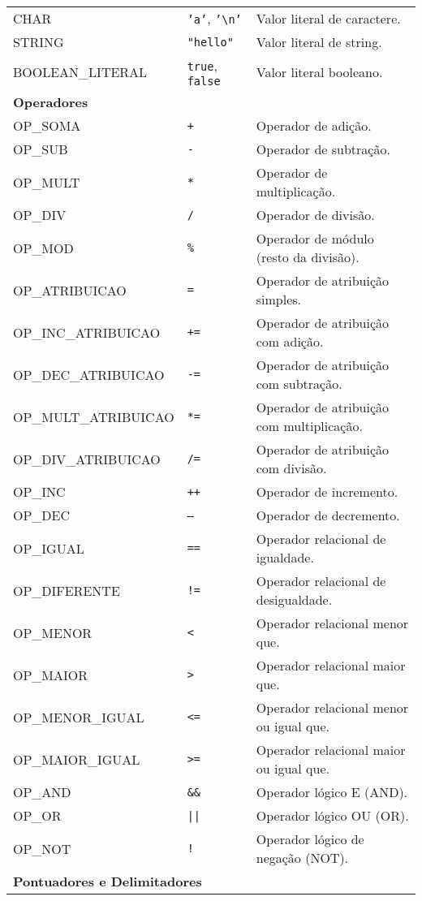 \documentclass[12pt,a4paper]{article}
\begin{document}
\begin{longtable}{lll}
CHAR & \texttt{'a'}, \texttt{'\textbackslash n'} & Valor literal de caractere. \\
STRING & \texttt{"hello"} & Valor literal de string. \\
BOOLEAN\_LITERAL & \texttt{true}, \texttt{false} & Valor literal booleano. \\
\midrule
\multicolumn{3}{l}{\textbf{Operadores}} \\
\midrule
OP\_SOMA & \texttt{+} & Operador de adição. \\
OP\_SUB & \texttt{-} & Operador de subtração. \\
OP\_MULT & \texttt{*} & Operador de multiplicação. \\
OP\_DIV & \texttt{/} & Operador de divisão. \\
OP\_MOD & \texttt{\%} & Operador de módulo (resto da divisão). \\
OP\_ATRIBUICAO & \texttt{=} & Operador de atribuição simples. \\
OP\_INC\_ATRIBUICAO & \texttt{+=} & Operador de atribuição com adição. \\
OP\_DEC\_ATRIBUICAO & \texttt{-=} & Operador de atribuição com subtração. \\
OP\_MULT\_ATRIBUICAO & \texttt{*=} & Operador de atribuição com multiplicação. \\
OP\_DIV\_ATRIBUICAO & \texttt{/=} & Operador de atribuição com divisão. \\
OP\_INC & \texttt{++} & Operador de incremento. \\
OP\_DEC & \texttt{--} & Operador de decremento. \\
OP\_IGUAL & \texttt{==} & Operador relacional de igualdade. \\
OP\_DIFERENTE & \texttt{!=} & Operador relacional de desigualdade. \\
OP\_MENOR & \texttt{<} & Operador relacional menor que. \\
OP\_MAIOR & \texttt{>} & Operador relacional maior que. \\
OP\_MENOR\_IGUAL & \texttt{<=} & Operador relacional menor ou igual que. \\
OP\_MAIOR\_IGUAL & \texttt{>=} & Operador relacional maior ou igual que. \\
OP\_AND & \texttt{\&\&} & Operador lógico E (AND). \\
OP\_OR & \texttt{||} & Operador lógico OU (OR). \\
OP\_NOT & \texttt{!} & Operador lógico de negação (NOT). \\
\midrule
\multicolumn{3}{l}{\textbf{Pontuadores e Delimitadores}} \\

\end{longtable}
\end{document}
